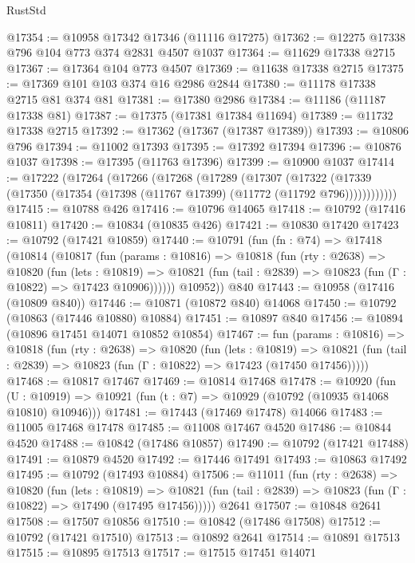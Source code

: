 \begin{lexlean}{RustStd}
\begin{coremodule}
@17354 := @10958 @17342 @17346 (@11116 @17275)
@17362 := @12275 @17338 @796 @104 @773 @374 @2831 @4507 @1037
@17364 := @11629 @17338 @2715
@17367 := @17364 @104 @773 @4507
@17369 := @11638 @17338 @2715
@17375 := @17369 @101 @103 @374 @16 @2986 @2844
@17380 := @11178 @17338 @2715 @81 @374 @81
@17381 := @17380 @2986
@17384 := @11186 (@11187 @17338 @81)
@17387 := @17375 (@17381 @17384 @11694)
@17389 := @11732 @17338 @2715
@17392 := @17362 (@17367 (@17387 @17389))
@17393 := @10806 @796
@17394 := @11002 @17393
@17395 := @17392 @17394
@17396 := @10876 @1037
@17398 := @17395 (@11763 @17396)
@17399 := @10900 @1037
@17414 := @17222
    (@17264
      (@17266
        (@17268
          (@17289
            (@17307
              (@17322
                (@17339 (@17350 (@17354 (@17398 (@11767 @17399) (@11772 (@11792 @796))))))))))))
@17415 := @10788 @426
@17416 := @10796 @14065
@17418 := @10792 (@17416 @10811)
@17420 := @10834 (@10835 @426)
@17421 := @10830 @17420
@17423 := @10792 (@17421 @10859)
@17440 := @10791
    (fun (fn : @74) =>
    @17418
      (@10814
        (@10817
          (fun (params : @10816) =>
          @10818
            (fun (rty : @2638) =>
            @10820
              (fun (lets : @10819) =>
              @10821 (fun (tail : @2839) => @10823 (fun (Γ : @10822) => @17423 @10906))))))
        @10952))
    @840
@17443 := @10958 (@17416 (@10809 @840))
@17446 := @10871 (@10872 @840) @14068
@17450 := @10792 (@10863 (@17446 @10880) @10884)
@17451 := @10897 @840
@17456 := @10894 (@10896 @17451 @14071 @10852 @10854)
@17467 := fun (params : @10816) =>
  @10818
    (fun (rty : @2638) =>
    @10820
      (fun (lets : @10819) =>
      @10821 (fun (tail : @2839) => @10823 (fun (Γ : @10822) => @17423 (@17450 @17456)))))
@17468 := @10817 @17467
@17469 := @10814 @17468
@17478 := @10920
    (fun (U : @10919) => @10921 (fun (t : @7) => @10929 (@10792 (@10935 @14068 @10810) @10946)))
@17481 := @17443 (@17469 @17478) @14066
@17483 := @11005 @17468 @17478
@17485 := @11008 @17467 @4520
@17486 := @10844 @4520
@17488 := @10842 (@17486 @10857)
@17490 := @10792 (@17421 @17488)
@17491 := @10879 @4520
@17492 := @17446 @17491
@17493 := @10863 @17492
@17495 := @10792 (@17493 @10884)
@17506 := @11011
    (fun (rty : @2638) =>
    @10820
      (fun (lets : @10819) =>
      @10821 (fun (tail : @2839) => @10823 (fun (Γ : @10822) => @17490 (@17495 @17456)))))
    @2641
@17507 := @10848 @2641
@17508 := @17507 @10856
@17510 := @10842 (@17486 @17508)
@17512 := @10792 (@17421 @17510)
@17513 := @10892 @2641
@17514 := @10891 @17513
@17515 := @10895 @17513
@17517 := @17515 @17451 @14071

\end{coremodule}
\end{lexlean}
